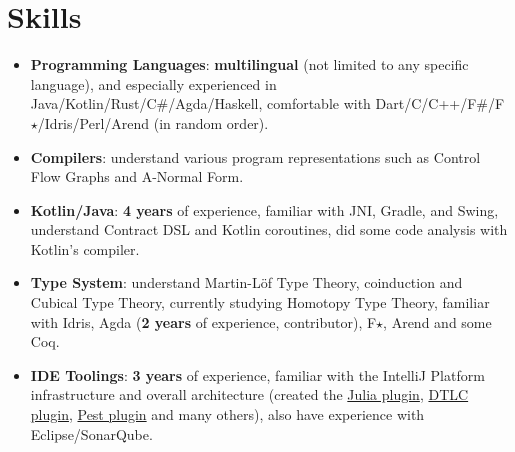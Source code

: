 \documentclass{resume}
\begin{document}


\section{Skills}
\begin{itemize}[parsep=0.25ex]
  \item \textbf{Programming Languages}:
    \textbf{multilingual} (not limited to any specific language),
    and especially experienced in Java/Kotlin/Rust/C\#/Agda/Haskell,
    comfortable with Dart/C/C++/F\#/F$\star$/Idris/Perl/Arend (in random order).

  \item \textbf{Compilers}:
    understand various program representations such as Control Flow Graphs
    and A-Normal Form.

  \item \textbf{Kotlin/Java}:
    \textbf{4 years} of experience,
    familiar with JNI, Gradle, and Swing,
    understand Contract DSL and Kotlin coroutines,
    did some code analysis with Kotlin's compiler.

  \item \textbf{Type System}:
    understand Martin-L\"{o}f Type Theory, coinduction and Cubical Type Theory,
    currently studying Homotopy Type Theory,
    familiar with Idris, Agda (\textbf{2 years} of experience, contributor), F$\star$, Arend and some Coq.


  \item \textbf{IDE Toolings}:
    \textbf{3 years} of experience,
    familiar with the IntelliJ Platform infrastructure and overall
    architecture (created the
    \href{https://plugins.jetbrains.com/plugin/10413}
         {Julia plugin},
    \href{https://plugins.jetbrains.com/plugin/12176}
         {DTLC plugin},
    \href{https://plugins.jetbrains.com/plugin/12046}
         {Pest plugin} and many others), also have experience with Eclipse/SonarQube.


\end{itemize}
\end{document}
